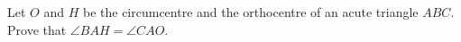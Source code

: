 Let $O$ and $H$ be the circumcentre and the orthocentre of an acute triangle $ABC$. Prove that $\angle BAH=\angle CAO$.
